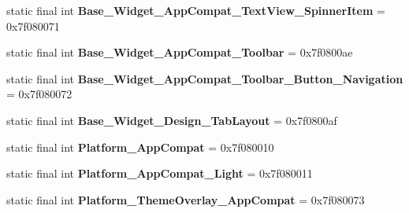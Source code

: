 \begin{DoxyCompactItemize}
\item 
\hypertarget{classandroid_1_1support_1_1design_1_1_r_1_1style_a7682f5a21cba08ffd067009c829c4e14}{}static final int {\bfseries Base\+\_\+\+Widget\+\_\+\+App\+Compat\+\_\+\+Text\+View\+\_\+\+Spinner\+Item} = 0x7f080071\label{classandroid_1_1support_1_1design_1_1_r_1_1style_a7682f5a21cba08ffd067009c829c4e14}

\item 
\hypertarget{classandroid_1_1support_1_1design_1_1_r_1_1style_a288f7bda20a0a4f6422a8a02ebb0e945}{}static final int {\bfseries Base\+\_\+\+Widget\+\_\+\+App\+Compat\+\_\+\+Toolbar} = 0x7f0800ae\label{classandroid_1_1support_1_1design_1_1_r_1_1style_a288f7bda20a0a4f6422a8a02ebb0e945}

\item 
\hypertarget{classandroid_1_1support_1_1design_1_1_r_1_1style_ab13628e7e74bf48ac4e618287e6bff4e}{}static final int {\bfseries Base\+\_\+\+Widget\+\_\+\+App\+Compat\+\_\+\+Toolbar\+\_\+\+Button\+\_\+\+Navigation} = 0x7f080072\label{classandroid_1_1support_1_1design_1_1_r_1_1style_ab13628e7e74bf48ac4e618287e6bff4e}

\item 
\hypertarget{classandroid_1_1support_1_1design_1_1_r_1_1style_a45452ddaf6cb0ff3c1fba11ccaa82526}{}static final int {\bfseries Base\+\_\+\+Widget\+\_\+\+Design\+\_\+\+Tab\+Layout} = 0x7f0800af\label{classandroid_1_1support_1_1design_1_1_r_1_1style_a45452ddaf6cb0ff3c1fba11ccaa82526}

\item 
\hypertarget{classandroid_1_1support_1_1design_1_1_r_1_1style_a5be61a46aa87257526f21945abcb1e6a}{}static final int {\bfseries Platform\+\_\+\+App\+Compat} = 0x7f080010\label{classandroid_1_1support_1_1design_1_1_r_1_1style_a5be61a46aa87257526f21945abcb1e6a}

\item 
\hypertarget{classandroid_1_1support_1_1design_1_1_r_1_1style_af1cc29433f47e8f74d2b4a99ca31bf2e}{}static final int {\bfseries Platform\+\_\+\+App\+Compat\+\_\+\+Light} = 0x7f080011\label{classandroid_1_1support_1_1design_1_1_r_1_1style_af1cc29433f47e8f74d2b4a99ca31bf2e}

\item 
\hypertarget{classandroid_1_1support_1_1design_1_1_r_1_1style_a174877dc3fe691299685c566a680f6dd}{}static final int {\bfseries Platform\+\_\+\+Theme\+Overlay\+\_\+\+App\+Compat} = 0x7f080073\label{classandroid_1_1support_1_1design_1_1_r_1_1style_a174877dc3fe691299685c566a680f6dd}


\end{DoxyCompactItemize}
